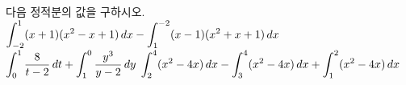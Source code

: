 다음 정적분의 값을 구하시오.
 $\displaystyle\int_{-2}^{1}(x+1)(x^2-x+1)\mkern3mu dx-\int_{1}^{-2}(x-1)(x^2+x+1)\mkern3mu dx$
 $\displaystyle\int_{0}^{1}\dfrac{8}{t-2}\mkern3mu dt+\int_{1}^{0}\dfrac{y^3}{y-2}\mkern3mu dy$
 $\displaystyle\int_{2}^{4}(x^2-4x)\mkern3mu dx-\int_{3}^{4}(x^2-4x)\mkern3mu dx+\int_{1}^{2}(x^2-4x)\mkern3mu dx$
